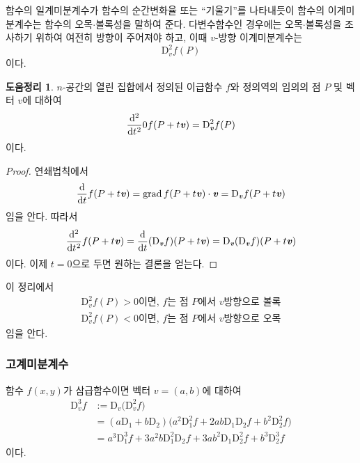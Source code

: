 \documentclass[unfonts,oneside,a4paper]{oblivoir}
\theoremstyle{definition}
\theoremstyle{theorem}
\newtheorem{lemma}{도움정리}[subsubsection]
\renewcommand{\vec}[1]{\bm{\mathit{#1}}}
\newcommand{\dD}{\mathrm{D}}
\DeclareMathOperator{\grad}{grad}
\begin{document}
함수의 일계미분계수가 함수의 순간변화율 또는 ``기울기''를 나타내듯이 함수의 이계미분계수는 함수의 오목$\cdot$볼록성을 말하여 준다.
다변수함수인 경우에는 오목$\cdot$볼록성을 조사하기 위하여 여전히 방향이 주어져야 하고, 이때 $\vec v$-방향 이계미분계수는
\begin{equation*}
    \dD_{\vec v}^2 f(P)
\end{equation*}
이다.

\begin{lemma} \label{lem:second_ord}
    $n$-공간의 열린 집합에서 정의된 이급함수 $f$와 정의역의 임의의 점 $P$ 및 벡터 $\vec v$에 대하여
    \begin{equation*}
        \diff*[2]{}{t}{0} f(P + t \vec v) = \dD_{\vec v}^2 f(P)
    \end{equation*}
    이다.
\end{lemma}

\begin{proof}
    연쇄법칙에서
    \begin{equation*}
        \diff*{f(P + t \vec v)}{t} = \grad f(P + t \vec v) \cdot \vec v = \dD_{\vec v} f(P + t \vec v)
    \end{equation*}
    임을 안다.
    따라서
    \begin{equation*}
        \diff*[2]{f(P+ t \vec v)}{t} = \diff*{(\dD_{\vec v}f)}{t} (P + t \vec v) = \dD_{\vec v} (\dD_{\vec v}f)(P + t \vec v)
    \end{equation*}
    이다.
    이제 $t = 0$으로 두면 원하는 결론을 얻는다.
\end{proof}

이 정리에서
\begin{align*}
    \dD_{\vec v}^2 f(P) > 0 \text{이면, $f$는 점 $P$에서 $\vec v$방향으로 볼록}\\
    \dD_{\vec v}^2 f(P) < 0 \text{이면, $f$는 점 $P$에서 $\vec v$방향으로 오목}
\end{align*}
임을 안다.

\subsubsection{고계미분계수}
함수 $f(x, y)$가 삼급함수이면 벡터 $\vec v = (a, b)$에 대하여
\begin{align*}
    \dD_{\vec v}^3 f &:= \dD_{\vec v} \bigl(\dD_{\vec v}^2 f\bigr)\\
                     &= (a \dD_1 + b \dD_2) \bigl(a^2 \dD_1^2 f + 2ab \dD_1 \dD_2 f + b^2 \dD_2^2 f\bigr)\\
                     &= a^3 \dD_1^3 f + 3a^2 b \dD_1^2 \dD_2 f + 3ab^2 \dD_1 \dD_2^2 f + b^3 \dD_2^3 f
\end{align*}
이다.
\end{document}

